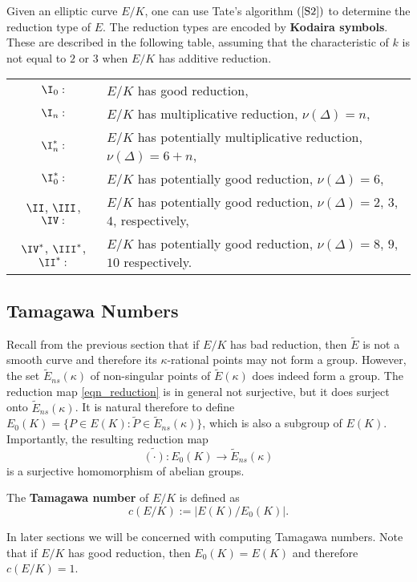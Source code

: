 Given an elliptic curve $E / K$, one can use Tate's algorithm $(\cite[\S \text{IV}.9]{S2})$ to determine the reduction type of $E$. The reduction types are encoded by \textbf{Kodaira symbols}. These are described in the following table, assuming that the characteristic of $k$ is not equal to $2$ or $3$ when $E / K$ has additive reduction.
\begin{table}[H]
    \centering
    \begin{tabular}{ c | l }
        $\I_0:$ & $E / K$ has good reduction, \\ 
        $\I_n:$ & $E / K$ has multiplicative reduction, $\nu(\Delta) = n$,\\
        $\I_n^* :$ & $E / K$ has potentially multiplicative reduction, $\nu(\Delta) = 6 + n$, \\
        $\I_0^*:$ & $E / K$ has potentially good reduction, $\nu(\Delta) = 6$, \\
        $\II$, $\III$, $\IV:$ & $E / K$ has potentially good reduction, $\nu(\Delta) = 2$, $3$, $4$, respectively,\\
        $\IV^*$, $\III^*$, $\II^*:$ & $E / K$ has potentially good reduction, $\nu(\Delta) = 8$, $9$, $10$ respectively. 
    \end{tabular}
\end{table}


\subsection{Tamagawa Numbers} \label{subs_tamagawa}

Recall from the previous section that if $E/K$ has bad reduction, then $\tilde{E}$ is not a smooth curve and therefore its $\kappa$-rational points may not form a group. However, the set $\tilde{E}_{ns}(\kappa)$ of non-singular points of $\tilde{E}(\kappa)$ does indeed form a group. The reduction map \eqref{eqn_reduction} is in general not surjective, but it does surject onto $\tilde{E}_{ns}(\kappa)$. It is natural therefore to define $E_0(K)=\{P\in E(K):\widetilde{P}\in\tilde{E}_{ns}(\kappa)\}$, which is also a subgroup of $E(K)$. Importantly, the resulting reduction map 
$$\widetilde{(\cdot)}:E_0(K)\longrightarrow \tilde{E}_{ns}(\kappa)$$
is a surjective homomorphism of abelian groups.
\begin{defn}
    The \textbf{Tamagawa number} of $E/K$ is defined as
    \begin{equation}
        c(E/K):=|E(K)/E_0(K)|.
    \end{equation}
\end{defn}
In later sections we will be concerned with computing Tamagawa numbers. Note that if $E/K$ has good reduction, then $E_0(K)=E(K)$ and therefore $c(E/K)=1$. %

